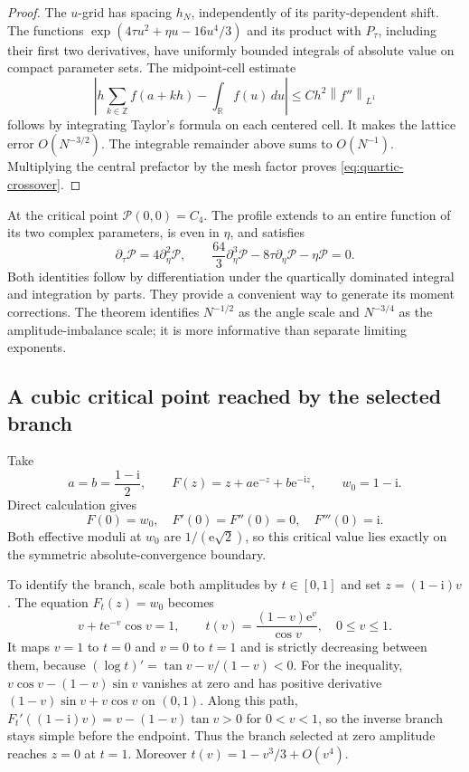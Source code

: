 \documentclass[11pt,a4paper]{article}
\numberwithin{equation}{section}
\theoremstyle{definition}
\theoremstyle{remark}
\newcommand{\R}{\mathbb R}
\newcommand{\Z}{\mathbb Z}
\newcommand{\ii}{\mathrm i}
\newcommand{\e}{\mathrm e}
\newcommand{\norm}[1]{\left\|#1\right\|}
\begin{document}
\begin{proof}
The $u$-grid has spacing $h_N$, independently of its parity-dependent
shift. The functions $\exp(4\tau u^2+\eta u-16u^4/3)$ and its product
with $P_\tau$, including their first two derivatives, have uniformly
bounded integrals of absolute value on compact parameter sets. The
midpoint-cell estimate
\[
 \left|h\sum_{k\in\Z}f(a+kh)-\int_\R f(u)\,du\right|
 \le C h^2\norm{f''}_{L^1}
\]
follows by integrating Taylor's formula on each centered cell. It
makes the lattice error $O(N^{-3/2})$. The integrable remainder above
sums to $O(N^{-1})$. Multiplying the central prefactor by the mesh
factor proves \eqref{eq:quartic-crossover}.
\end{proof}

At the critical point $\mathcal P(0,0)=C_4$. The profile extends to
an entire function of its two complex parameters, is even in $\eta$,
and satisfies
\begin{equation}\label{eq:profile-pdes}
 \partial_\tau\mathcal P=4\partial_\eta^2\mathcal P,
 \qquad
 \frac{64}{3}\partial_\eta^3\mathcal P
 -8\tau\partial_\eta\mathcal P-\eta\mathcal P=0.
\end{equation}
Both identities follow by differentiation under the quartically
dominated integral and integration by parts. They provide a convenient
way to generate its moment corrections. The theorem identifies
$N^{-1/2}$ as the angle scale and $N^{-3/4}$ as the amplitude-imbalance
scale; it is more informative than separate limiting exponents.

\subsection{A cubic critical point reached by the selected branch}

Take
\begin{equation}\label{eq:cubic-example}
 a=b=\frac{1-\ii}{2},\qquad
 F(z)=z+a\e^{-z}+b\e^{-\ii z},\qquad w_0=1-\ii.
\end{equation}
Direct calculation gives
\begin{equation}\label{eq:cubic-derivatives}
 F(0)=w_0,\quad F'(0)=F''(0)=0,\quad F'''(0)=\ii.
\end{equation}
Both effective moduli at $w_0$ are $1/(\e\sqrt2)$, so this critical
value lies exactly on the symmetric absolute-convergence boundary.

To identify the branch, scale both amplitudes by $t\in[0,1]$ and set
$z=(1-\ii)v$. The equation $F_t(z)=w_0$ becomes
\[
 v+t\e^{-v}\cos v=1,\qquad
 t(v)=\frac{(1-v)\e^v}{\cos v},\quad 0\le v\le1.
\]
It maps $v=1$ to $t=0$ and $v=0$ to $t=1$ and is strictly decreasing
between them, because $(\log t)'=\tan v-v/(1-v)<0$.
For the inequality, $v\cos v-(1-v)\sin v$ vanishes at zero and has
positive derivative $(1-v)\sin v+v\cos v$ on $(0,1)$.
Along this path,
$F_t'((1-\ii)v)=v-(1-v)\tan v>0$ for $0<v<1$,
so the inverse branch stays simple before the endpoint.
Thus the branch selected at zero amplitude reaches $z=0$ at $t=1$.
Moreover $t(v)=1-v^3/3+O(v^4)$.
\end{document}
